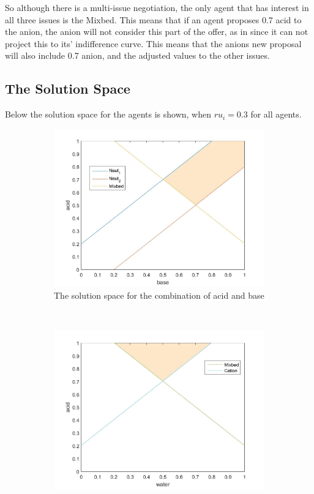 So although there is a multi-issue negotiation, the only agent that has interest in all three issues is the Mixbed. This means that if an agent proposes 0.7 acid to the anion, the anion will not consider this part of the offer, as in since it can not project this to its' indifference curve. This means that the anions new proposal will also include 0.7 anion, and the adjusted values to the other issues.
\clearpage
\subsection{The Solution Space}
Below the solution space for the agents is shown, when $ru_i = 0.3$ for all agents.
\begin{figure}[h]
	\centering
	\begin{subfigure}[b]{0.4\textwidth}
		\centering
		\includegraphics[width=\linewidth]{img/reservationcurve_base_acid}
		\caption{The solution space for the combination of acid and base}
		\label{fig:solutionbaseacid}
	\end{subfigure}
	~
	\begin{subfigure}[b]{0.4\textwidth}
		\includegraphics[width=\linewidth]{img/reservationcurve_water_acid}

\end{subfigure}
\end{figure}
